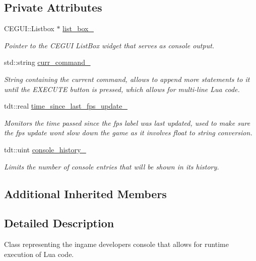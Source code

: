 \subsection*{Private Attributes}
\begin{DoxyCompactItemize}
\item 
C\+E\+G\+U\+I\+::\+Listbox $\ast$ \hyperlink{class_console_ac8c64e8d5a77ea61af8cf6c87f6ef1cd}{list\+\_\+box\+\_\+}
\begin{DoxyCompactList}\small\item\em Pointer to the C\+E\+G\+UI List\+Box widget that serves as console output. \end{DoxyCompactList}\item 
std\+::string \hyperlink{class_console_ae1b7c7ad9e7310a6144612824065de23}{curr\+\_\+command\+\_\+}
\begin{DoxyCompactList}\small\item\em String containing the current command, allows to append more statements to it until the E\+X\+E\+C\+U\+TE button is pressed, which allows for multi-\/line Lua code. \end{DoxyCompactList}\item 
tdt\+::real \hyperlink{class_console_a03cc9dd49492a409815f1384597f89dc}{time\+\_\+since\+\_\+last\+\_\+fps\+\_\+update\+\_\+}
\begin{DoxyCompactList}\small\item\em Monitors the time passed since the fps label was last updated, used to make sure the fps update won\textquotesingle{}t slow down the game as it involves float to string conversion. \end{DoxyCompactList}\item 
tdt\+::uint \hyperlink{class_console_af83f5294b62404b4c5190d4e9a1d3ea8}{console\+\_\+history\+\_\+}
\begin{DoxyCompactList}\small\item\em Limits the number of console entries that will be shown in it\textquotesingle{}s history. \end{DoxyCompactList}\end{DoxyCompactItemize}
\subsection*{Additional Inherited Members}


\subsection{Detailed Description}
Class representing the ingame developers console that allows for runtime execution of Lua code. 

